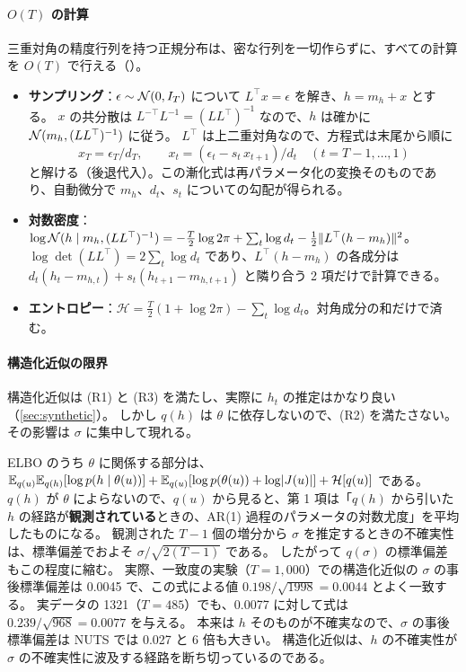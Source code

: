 \paragraph{$O(T)$ の計算}
三重対角の精度行列を持つ正規分布は、密な行列を一切作らずに、すべての計算を $O(T)$ で行える（）。
\begin{itemize}
  \item \textbf{サンプリング}：$\epsilon \sim \mathcal{N}(0, I_T)$ について $L^\top x = \epsilon$ を解き、$h = m_h + x$ とする。
    $x$ の共分散は $L^{-\top} L^{-1} = (L L^\top)^{-1}$ なので、$h$ は確かに $\mathcal{N}(m_h, (LL^\top)^{-1})$ に従う。
    $L^\top$ は上二重対角なので、方程式は末尾から順に
    \[
      x_T = \epsilon_T / d_T, \qquad x_t = (\epsilon_t - s_t\, x_{t+1}) / d_t \quad (t = T-1, \dots, 1)
    \]
    と解ける（後退代入）。この漸化式は再パラメータ化の変換そのものであり、自動微分で $m_h$、$d_t$、$s_t$ についての勾配が得られる。
  \item \textbf{対数密度}：$\log \mathcal{N}(h \mid m_h, (LL^\top)^{-1}) = -\frac{T}{2}\log 2\pi + \sum_t \log d_t - \frac{1}{2} \lVert L^\top (h - m_h) \rVert^2$。
    $\log\det(LL^\top) = 2\sum_t \log d_t$ であり、$L^\top(h - m_h)$ の各成分は $d_t (h_t - m_{h,t}) + s_t (h_{t+1} - m_{h,t+1})$ と隣り合う 2 項だけで計算できる。
  \item \textbf{エントロピー}：$\mathcal{H} = \frac{T}{2}(1 + \log 2\pi) - \sum_t \log d_t$。対角成分の和だけで済む。
\end{itemize}

\paragraph{構造化近似の限界}
構造化近似は (R1) と (R3) を満たし、実際に $h_t$ の推定はかなり良い（\cref{sec:synthetic}）。
しかし $q(h)$ は $\theta$ に依存しないので、(R2) を満たさない。その影響は $\sigma$ に集中して現れる。

ELBO のうち $\theta$ に関係する部分は、$\mathbb{E}_{q(u)}\mathbb{E}_{q(h)}[\log p(h \mid \theta(u))] + \mathbb{E}_{q(u)}[\log p(\theta(u)) + \log\lvert J(u)\rvert] + \mathcal{H}[q(u)]$ である。
$q(h)$ が $\theta$ によらないので、$q(u)$ から見ると、第 1 項は「$q(h)$ から引いた $h$ の経路が\textbf{観測されている}ときの、AR(1) 過程のパラメータの対数尤度」を平均したものになる。
観測された $T-1$ 個の増分から $\sigma$ を推定するときの不確実性は、標準偏差でおよそ $\sigma / \sqrt{2(T-1)}$ である。
したがって $q(\sigma)$ の標準偏差もこの程度に縮む。
実際、一致度の実験（$T = 1{,}000$）での構造化近似の $\sigma$ の事後標準偏差は 0.0045 で、この式による値 $0.198/\sqrt{1998} = 0.0044$ とよく一致する。
実データの 1321（$T = 485$）でも、0.0077 に対して式は $0.239/\sqrt{968} = 0.0077$ を与える。
本来は $h$ そのものが不確実なので、$\sigma$ の事後標準偏差は NUTS では 0.027 と 6 倍も大きい。
構造化近似は、$h$ の不確実性が $\sigma$ の不確実性に波及する経路を断ち切っているのである。

